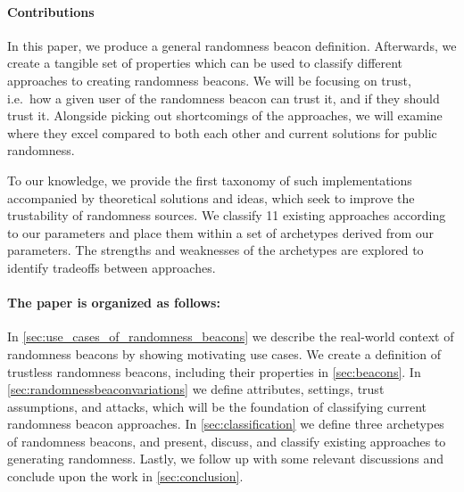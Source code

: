 \paragraph{Contributions}\label{subsec:contributions}
In this paper, we produce a general randomness beacon definition. Afterwards, we create a tangible set of properties which can be used to classify different approaches to creating randomness beacons.
We will be focusing on trust, i.e.\ how a given user of the randomness beacon can trust it, and if they should trust it.
Alongside picking out shortcomings of the approaches, we will examine where they excel compared to both each other and current solutions for public randomness.

To our knowledge, we provide the first taxonomy of such implementations accompanied by theoretical solutions and ideas, which seek to improve the trustability of randomness sources.
We classify 11 existing approaches according to our parameters and place them within a set of archetypes derived from our parameters. The strengths and weaknesses of the archetypes are explored to identify tradeoffs between approaches.


\paragraph{The paper is organized as follows:}
In \cref{sec:use_cases_of_randomness_beacons} we describe the real-world context of randomness beacons by showing motivating use cases.
We create a definition of trustless randomness beacons, including their properties in \cref{sec:beacons}. In \cref{sec:randomnessbeaconvariations} we define attributes, settings, trust assumptions, and attacks, which will be the foundation of classifying current randomness beacon approaches.
In \cref{sec:classification} we define three archetypes of randomness beacons, and present, discuss, and classify existing approaches to generating randomness.
Lastly, we follow up with some relevant discussions and  conclude upon the work in \cref{sec:conclusion}.
